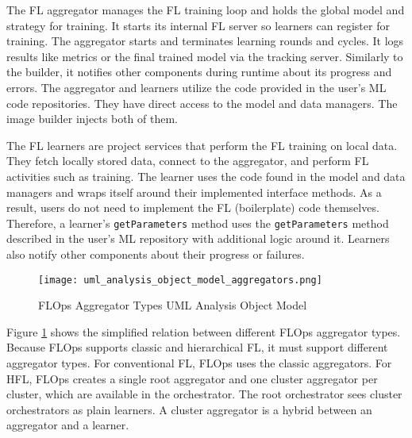 The FL aggregator manages the FL training loop and holds the global model and strategy for training.
It starts its internal FL server so learners can register for training.
The aggregator starts and terminates learning rounds and cycles.
It logs results like metrics or the final trained model via the tracking server.
Similarly to the builder, it notifies other components during runtime about its progress and errors.
The aggregator and learners utilize the code provided in the user's ML code repositories.
They have direct access to the model and data managers.
The image builder injects both of them.

The FL learners are project services that perform the FL training on local data.
They fetch locally stored data, connect to the aggregator, and perform FL activities such as training.
The learner uses the code found in the model and data managers and wraps itself around their implemented interface methods.
As a result, users do not need to implement the FL (boilerplate) code themselves.
Therefore, a learner's \texttt{getParameters} method uses the \texttt{getParameters} method described in the user's ML repository with additional logic around it.
Learners also notify other components about their progress or failures.

\begin{figure}[t]
    \centering
    \texttt{[image: uml\_analysis\_object\_model\_aggregators.png]}
    \caption{FLOps Aggregator Types UML Analysis Object Model}
    \label{fig:uml_project_aggregators_analysis_object_model}
\end{figure}

Figure \ref{fig:uml_project_aggregators_analysis_object_model} shows the simplified relation between different FLOps aggregator types.
Because FLOps supports classic and hierarchical FL, it must support different aggregator types.
For conventional FL, FLOps uses the classic aggregators.
For HFL, FLOps creates a single root aggregator and one cluster aggregator per cluster, which are available in the orchestrator.
The root orchestrator sees cluster orchestrators as plain learners.
A cluster aggregator is a hybrid between an aggregator and a learner.